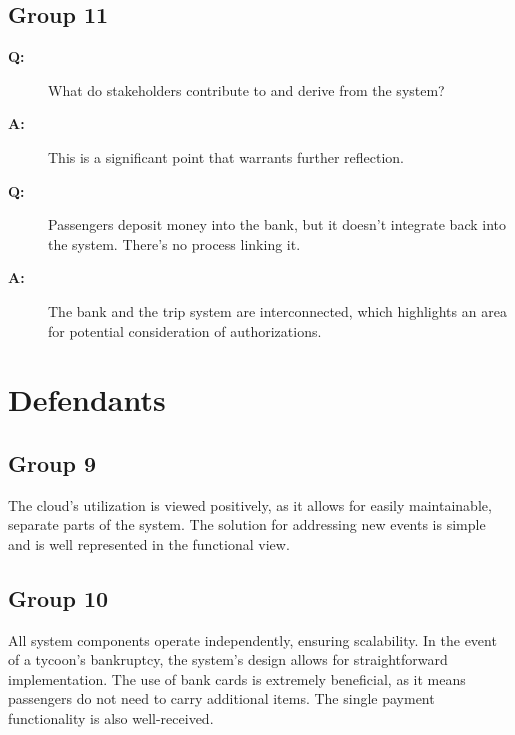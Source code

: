 \documentclass{article}
\begin{document}
\subsection{Group 11}
\begin{description}
  \item[\textbf{Q:}] What do stakeholders contribute to and derive from the system?
  \item[\textbf{A:}] This is a significant point that warrants further reflection.
  
  \item[\textbf{Q:}] Passengers deposit money into the bank, but it doesn't integrate back into the system. There's no process linking it.
  \item[\textbf{A:}] The bank and the trip system are interconnected, which highlights an area for potential consideration of authorizations.
\end{description}

\section{Defendants}

\subsection{Group 9}
The cloud's utilization is viewed positively, as it allows for easily maintainable, separate parts of the system. The solution for addressing new events is simple and is well represented in the functional view.

\subsection{Group 10}
All system components operate independently, ensuring scalability. In the event of a tycoon's bankruptcy, the system's design allows for straightforward implementation. The use of bank cards is extremely beneficial, as it means passengers do not need to carry additional items. The single payment functionality is also well-received.
\end{document}
